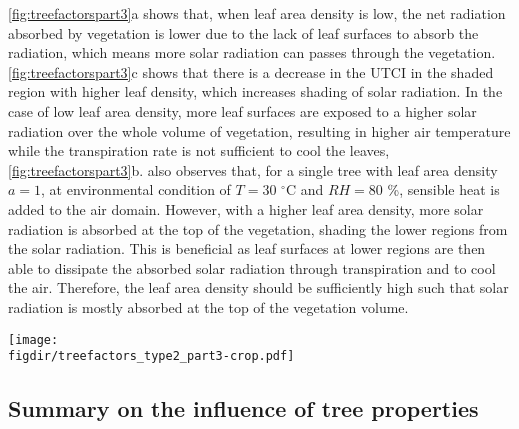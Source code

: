 \cref{fig:treefactorspart3}a shows that, when leaf area density is low, the net radiation absorbed by vegetation is lower due to the lack of leaf surfaces to absorb the radiation, which means more solar radiation can passes through the vegetation. \cref{fig:treefactorspart3}c shows that there is a decrease in the UTCI in the shaded region with higher leaf density, which increases shading of solar radiation. In the case of low leaf area density, more leaf surfaces are exposed to a higher solar radiation over the whole volume of vegetation, resulting in higher air temperature while the transpiration rate is not sufficient to cool the leaves, \cref{fig:treefactorspart3}b. \cite{Hiraoka2005} also observes that, for a single tree with leaf area density $a=1$, at environmental condition of $T=30$ $^{\circ}$C and $\textit{RH}=80$ \%, sensible heat is added to the air domain. However, with a higher leaf area density, more solar radiation is absorbed at the top of the vegetation, shading the lower regions from the solar radiation. This is beneficial as leaf surfaces at lower regions are then able to dissipate the absorbed solar radiation through transpiration and to cool the air. Therefore, the leaf area density should be sufficiently high such that solar radiation is mostly absorbed at the top of the vegetation volume. 

	\begin{sidewaysfigure}[p]
	\centering
	\texttt{[image: \\figdir/treefactors\_type2\_part3-crop.pdf]}
	\caption{Influence of leaf area density $a$ (m$^{2}$\,m$^{-3}$) on  the net energy balance of radiation, sensible and latent heat fluxes at the trees, $\int a \cdot (q_{\textit{rad,leaf}}-q_{\textit{sen,leaf}}-q_{\textit{lat,leaf}})\ dA = 0$ W\,m$^{-1}$,  on air temperature $T-T_0$ ($^{\circ}$C), and  $\textit{UTCI}$ ($^{\circ}$C). Point measurement of air temperature and $UTCI$ at three locations as shown in \cref{fig:domain}: \textit{upstream} ({\color{flatuidarkred}\textbf{red}}), \textit{downstream} ({\color{flatuidarkblue}\textbf{blue}}) and \textit{shaded} (\textbf{black}) for transpiring (T) (solid, ---) and non-transpiring (NT) conditions (dashed, - - -).}
	\label{fig:treefactorspart3}
	\end{sidewaysfigure}

\subsection{Summary on the influence of tree properties}

